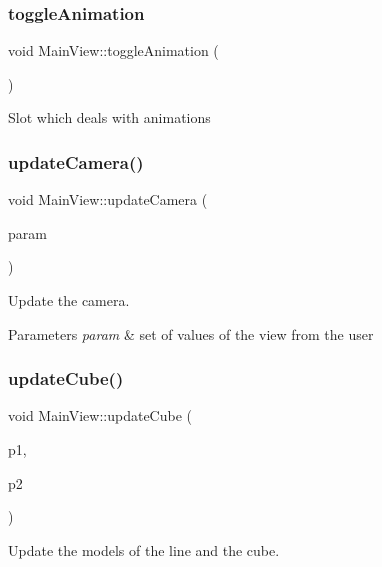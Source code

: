 \subsubsection{\texorpdfstring{toggle\+Animation}{toggleAnimation}}
{\footnotesize\ttfamily void Main\+View\+::toggle\+Animation (\begin{DoxyParamCaption}{ }\end{DoxyParamCaption})\hspace{0.3cm}{\ttfamily [slot]}}

Slot which deals with animations \hypertarget{class_main_view_a3a3c5e12f747bb2226401c3cbd7618f6}{}\label{class_main_view_a3a3c5e12f747bb2226401c3cbd7618f6} 
\subsubsection{\texorpdfstring{update\+Camera()}{updateCamera()}}
{\footnotesize\ttfamily void Main\+View\+::update\+Camera (\begin{DoxyParamCaption}\item[{\hyperlink{structset_of_view}{set\+Of\+View}}]{param }\end{DoxyParamCaption})}



Update the camera. 


\begin{DoxyParams}{Parameters}
{\em param} & set of values of the view from the user \\
\hline
\end{DoxyParams}
\hypertarget{class_main_view_a90f82be94e9397e1f12efbe1bd9dcc8a}{}\label{class_main_view_a90f82be94e9397e1f12efbe1bd9dcc8a} 
\subsubsection{\texorpdfstring{update\+Cube()}{updateCube()}}
{\footnotesize\ttfamily void Main\+View\+::update\+Cube (\begin{DoxyParamCaption}\item[{glm\+::vec3}]{p1,  }\item[{glm\+::vec3}]{p2 }\end{DoxyParamCaption})}



Update the models of the line and the cube. 



